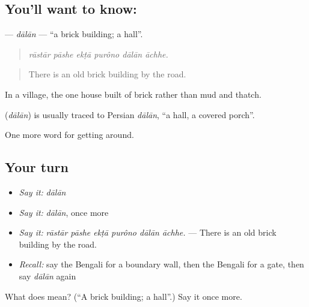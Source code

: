 \subsection*{You'll want to know: }
\textbf{} — \emph{dālān} — \textquotedblleft{}a brick building; a hall\textquotedblright{}.

\begin{quote}
     
\end{quote}

\begin{quote}
\emph{rāstār pāshe ekṭā purôno dālān āchhe.}
\end{quote}

\begin{quote}
There is an old brick building by the road.
\end{quote}

In a village, the one house built of brick rather than mud and thatch.

\begin{cousinweb}
\textbf{} (\emph{dālān}) is usually traced to Persian \emph{dālān}, \textquotedblleft{}a hall, a covered porch\textquotedblright{}.
\end{cousinweb}

\begin{grammarlens}[title={What you've built}]
One more word for getting around.
\end{grammarlens}

\subsection*{Your turn}
\begin{itemize}
\raggedright
  \item \emph{Say it:} \emph{dālān}
  \item \emph{Say it:} \emph{dālān}, once more
  \item \emph{Say it:} \emph{rāstār pāshe ekṭā purôno dālān āchhe.} — There is an old brick building by the road.
  \item \emph{Recall:} say the Bengali for a boundary wall, then the Bengali for a gate, then say \emph{dālān} again
\end{itemize}

\begin{tcolorbox}[breakable,colback=teal!4,colframe=teal!35!black,title={Before you move on}]
What does  mean? (\textquotedblleft{}A brick building; a hall\textquotedblright{}.) Say it once more.
\end{tcolorbox}
